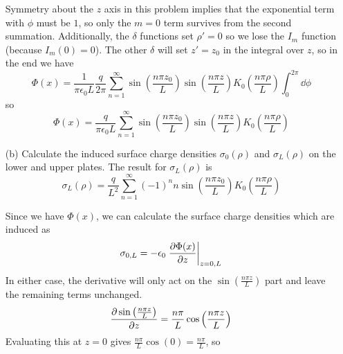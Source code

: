 \documentclass[a4paper,twoside]{article}
\begin{document}
\begin{itemize}
\begin{tcolorbox}[breakable]
\begin{equation}
            \end{equation}
            Symmetry about the $ z $ axis in this problem implies that the exponential term with $\phi$ must be $ 1 $, so only the $ m = 0 $ term survives from the second summation. Additionally, the $\delta$ functions set $\rho' = 0$ so we lose the $ I_m $ function (because $ I_m(0) = 0 $). The other $\delta$ will set $ z' = z_0 $ in the integral over $ z $, so in the end we have
            \begin{equation}
                \Phi(x) = \frac{1}{\pi \epsilon_0 L} \frac{q}{2 \pi} \sum_{n=1}^{\infty} \sin \left( \frac{n \pi z_0}{L} \right) \sin \left( \frac{n \pi z}{L} \right) K_0 \left( \frac{n \pi \rho}{L} \right)  \int_0^{2 \pi} \dd{\phi}
            \end{equation}
            so
            \begin{equation}
                \Phi(x) = \frac{q}{\pi \epsilon_0 L} \sum_{n=1}^{\infty} \sin \left( \frac{n \pi z_0}{L} \right) \sin \left( \frac{n \pi z}{L} \right) K_0 \left( \frac{n \pi \rho}{L} \right)
            \end{equation}
        \end{tcolorbox}
    \item[(b)] Calculate the induced surface charge densities $ \sigma_0(\rho) $ and $ \sigma_L(\rho) $ on the lower and upper plates. The result for $ \sigma_L(\rho) $ is
        \begin{equation}
            \sigma_L(\rho) = \frac{q}{L^2} \sum_{n=1}^{\infty} (-1)^n n \sin \left( \frac{n \pi z_0}{L} \right) K_0 \left( \frac{n \pi \rho}{L} \right)
        \end{equation}
        \begin{tcolorbox}[breakable]
            Since we have $ \Phi(x) $, we can calculate the surface charge densities which are induced as
            \begin{equation}
                \sigma_{0,L} = - \epsilon_0 \eval{\pdv{\Phi(x)}{z}}_{z=0,L}
            \end{equation}
            In either case, the derivative will only act on the $ \sin \left( \frac{n \pi z}{L} \right) $ part and leave the remaining terms unchanged.
            \begin{equation}
                \pdv{\sin \left( \frac{n \pi z}{L} \right)}{z} = \frac{n \pi}{L} \cos \left( \frac{n \pi z}{L} \right)
            \end{equation}
            Evaluating this at $ z = 0 $ gives $ \frac{n \pi}{L} \cos(0) = \frac{n \pi}{L} $, so

\end{tcolorbox}
\end{itemize}
\end{document}

